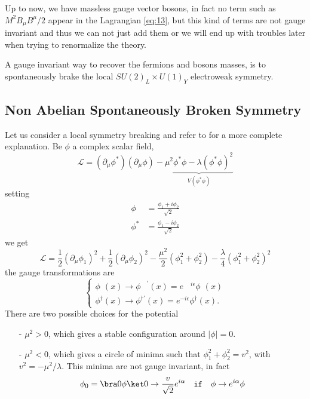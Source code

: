 Up to now, we have massless gauge vector bosons, in fact no term such as
$M^{2} B_{\mu}B^{\mu} / 2$ appear in the Lagrangian \eqref{eq:13}, but this kind
of terms are not gauge invariant and thus we can not just add them or we will
end up with troubles later when trying to renormalize the theory.

A gauge invariant way to recover the fermions and bosons masses, is to
spontaneously brake the local $SU(2)_{L} \times U(1)_{Y}$ electroweak symmetry.

\subsection{Non Abelian Spontaneously Broken Symmetry}
\label{sec:non-abel-spont}
Let us consider a local symmetry breaking and refer to \cite{martin:particle}
for a more complete explanation. Be $\phi$ a complex scalar field,
\begin{equation}
  \label{eq:25}
  \mathcal{L} = (\partial_{\mu} \phi^{*})(\partial_{\mu} \phi) -
  \underbrace{\mu^{2}\phi^{*}\phi - \lambda(\phi^{*}\phi)^{2}}_{V(\phi^{*}\phi)}
\end{equation}
setting
\begin{equation}
  \label{eq:26}
  \begin{split}
    \phi^{\phantom{*}} &= \frac{\phi_{1} + i \phi_{2}}{\sqrt{2}} \\
    \phi^{*} &= \frac{\phi_{1} - i \phi_{2}}{\sqrt{2}}
  \end{split}
\end{equation}
we get
\begin{equation}
  \label{eq:27}
  \mathcal{L} = \frac{1}{2} (\partial_{\mu} \phi_{1})^{2} +
  \frac{1}{2} ( \partial_{\mu} \phi_{2} )^{2} - \frac{\mu^{2}}{2} (
  \phi_{1}^{2} + \phi_{2}^{2} ) - \frac{\lambda}{4} ( \phi_{1}^{2} +
  \phi_{2}^{2} )^{2}
\end{equation}
the gauge transformations are
\begin{equation}
  \label{eq:28}
  \begin{cases}
    \phi^{\phantom{\dagger}}(x) \rightarrow \phi^{\phantom{\dagger}'}(x) =
    e^{\phantom{-} i \epsilon}
    \phi^{\phantom{\dagger}}(x) \\
    \phi^{\dagger} (x) \rightarrow \phi^{\dagger '} (x) = e^{- i \epsilon}
    \phi^{\dagger}(x).
  \end{cases}
\end{equation}
There are two possible choices for the potential
\begin{itemize}
\item[-] $\mu^{2} > 0$, which gives a stable configuration around $|\phi| = 0$.
\item[-] $\mu^{2} < 0$, which gives a circle of minima such that
  $\phi_{1}^{2} + \phi_{2}^{2} = v^{2}$, with $v^{2} = - \mu^{2} /
  \lambda$. This minima are not gauge invariant, in fact
  \begin{equation}
    \label{eq:29}
    \phi_{0} = \bra 0 \phi \ket 0 \rightarrow \frac{v}{\sqrt{2}} e^{i
      \alpha} \quad \mathtt{if} \quad \phi \rightarrow e^{i \alpha} \phi
  \end{equation}
\end{itemize}
